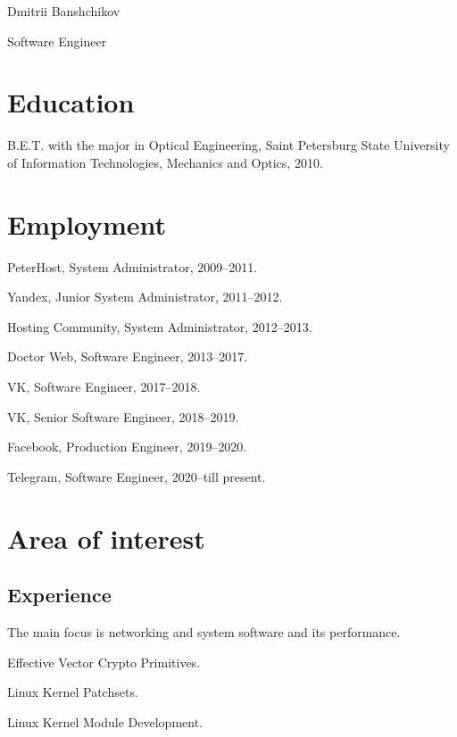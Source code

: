 \documentclass[letterpaper]{article}
\def\name{Dmitrii Banshchikov}
\renewenvironment{itemize}{
  \begin{list}{}{
    \setlength{\leftmargin}{1.5em}
  }
}{
  \end{list}
}
\begin{document}
{\huge \name}


\vspace{0.25in}

\begin{minipage}{0.45\linewidth}
  {Software Engineer } \\
\end{minipage}
\begin{minipage}{0.45\linewidth}
\end{minipage}


\section*{Education}

\begin{itemize}
  \item B.E.T. with the major in Optical Engineering, Saint Petersburg State University of Information Technologies, Mechanics and Optics, 2010.
\end{itemize}


\section*{Employment}

\begin{itemize}
\item PeterHost, System Administrator, 2009--2011.
\item Yandex, Junior System Administrator, 2011--2012.
\item Hosting Community, System Administrator, 2012--2013.
\item Doctor Web, Software Engineer, 2013--2017.
\item VK, Software Engineer, 2017--2018.
\item VK, Senior Software Engineer, 2018--2019.
\item Facebook, Production Engineer, 2019--2020.
\item Telegram, Software Engineer, 2020--till present.
\end{itemize}


\section*{Area of interest}

\subsection*{Experience}
\begin{itemize}
\item The main focus is networking and system software and its performance.
\item Effective Vector Crypto Primitives.
\item Linux Kernel Patchsets.
\item Linux Kernel Module Development.
\end{itemize}
\end{document}
